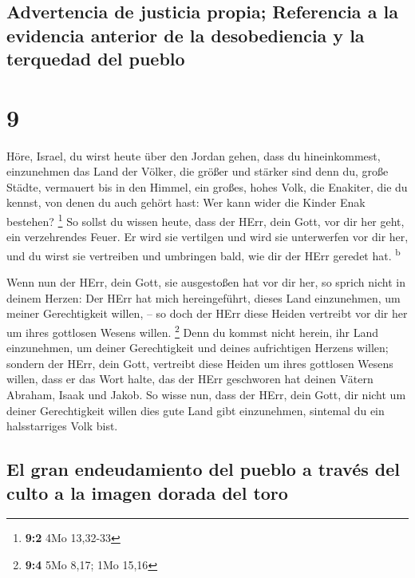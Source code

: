 \hypertarget{advertencia-de-justicia-propia-referencia-a-la-evidencia-anterior-de-la-desobediencia-y-la-terquedad-del-pueblo}{%
\subsection{Advertencia de justicia propia; Referencia a la evidencia
anterior de la desobediencia y la terquedad del
pueblo}\label{advertencia-de-justicia-propia-referencia-a-la-evidencia-anterior-de-la-desobediencia-y-la-terquedad-del-pueblo}}

\hypertarget{section-8}{%
\section{9}\label{section-8}}

 Höre, Israel, du wirst heute über den Jordan gehen, dass
du hineinkommest, einzunehmen das Land der Völker, die größer und
stärker sind denn du, große Städte, vermauert bis in den Himmel,
 ein großes, hohes Volk, die Enakiter, die du kennst, von
denen du auch gehört hast: Wer kann wider die Kinder Enak bestehen?
\footnote{\textbf{9:2} 4Mo 13,32-33}  So sollst du wissen
heute, dass der HErr, dein Gott, vor dir her geht, ein verzehrendes
Feuer. Er wird sie vertilgen und wird sie unterwerfen vor dir her, und
du wirst sie vertreiben und umbringen bald, wie dir der HErr geredet
hat. \textsuperscript{b}

 Wenn nun der HErr, dein Gott, sie ausgestoßen hat vor dir
her, so sprich nicht in deinem Herzen: Der HErr hat mich hereingeführt,
dieses Land einzunehmen, um meiner Gerechtigkeit willen, -- so doch der
HErr diese Heiden vertreibt vor dir her um ihres gottlosen Wesens
willen. \footnote{\textbf{9:4} 5Mo 8,17; 1Mo 15,16}  Denn
du kommst nicht herein, ihr Land einzunehmen, um deiner Gerechtigkeit
und deines aufrichtigen Herzens willen; sondern der HErr, dein Gott,
vertreibt diese Heiden um ihres gottlosen Wesens willen, dass er das
Wort halte, das der HErr geschworen hat deinen Vätern Abraham, Isaak und
Jakob.  So wisse nun, dass der HErr, dein Gott, dir nicht
um deiner Gerechtigkeit willen dies gute Land gibt einzunehmen, sintemal
du ein halsstarriges Volk bist.

\hypertarget{el-gran-endeudamiento-del-pueblo-a-travuxe9s-del-culto-a-la-imagen-dorada-del-toro}{%
\subsection{El gran endeudamiento del pueblo a través del culto a la
imagen dorada del
toro}\label{el-gran-endeudamiento-del-pueblo-a-travuxe9s-del-culto-a-la-imagen-dorada-del-toro}}


